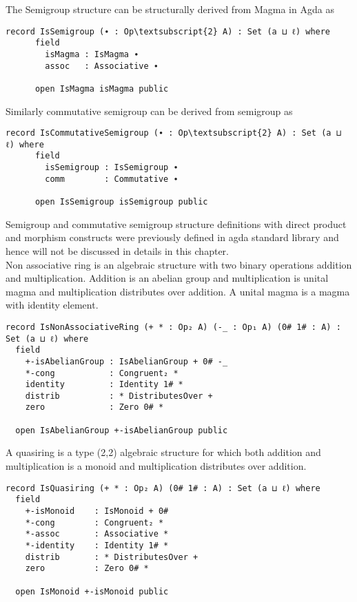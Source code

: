 The Semigroup structure can be structurally derived from Magma in Agda as 

\begin{Verbatim}[commandchars=\\\{\},samepage=true]
	record IsSemigroup (∙ : Op\textsubscript{2} A) : Set (a ⊔ ℓ) where
	  field
	    isMagma : IsMagma ∙
	    assoc   : Associative ∙
	
	  open IsMagma isMagma public
\end{Verbatim}
Similarly commutative semigroup can be derived from semigroup as
\begin{Verbatim}[commandchars=\\\{\},samepage=true]
	record IsCommutativeSemigroup (∙ : Op\textsubscript{2} A) : Set (a ⊔ ℓ) where
	  field
	    isSemigroup : IsSemigroup ∙
	    comm        : Commutative ∙
	
	  open IsSemigroup isSemigroup public
\end{Verbatim}
Semigroup and commutative semigroup structure definitions with direct product and morphism constructs were previously defined in agda standard library and hence will not be discussed in details in this chapter.\\
Non associative ring is an algebraic structure with two binary operations addition and multiplication. Addition is an abelian group and multiplication is unital magma and multiplication distributes over addition. A unital magma is a magma with identity element. 
\begin{Verbatim}
record IsNonAssociativeRing (+ * : Op₂ A) (-_ : Op₁ A) (0# 1# : A) : Set (a ⊔ ℓ) where
  field
    +-isAbelianGroup : IsAbelianGroup + 0# -_
    *-cong           : Congruent₂ *
    identity         : Identity 1# *
    distrib          : * DistributesOver +
    zero             : Zero 0# *

  open IsAbelianGroup +-isAbelianGroup public
\end{Verbatim}

A quasiring is a type (2,2) algebraic structure for which both addition and multiplication is a monoid and multiplication distributes over addition.

\begin{Verbatim}
record IsQuasiring (+ * : Op₂ A) (0# 1# : A) : Set (a ⊔ ℓ) where
  field
    +-isMonoid    : IsMonoid + 0#
    *-cong        : Congruent₂ *
    *-assoc       : Associative *
    *-identity    : Identity 1# *
    distrib       : * DistributesOver +
    zero          : Zero 0# *

  open IsMonoid +-isMonoid public
\end{Verbatim}

